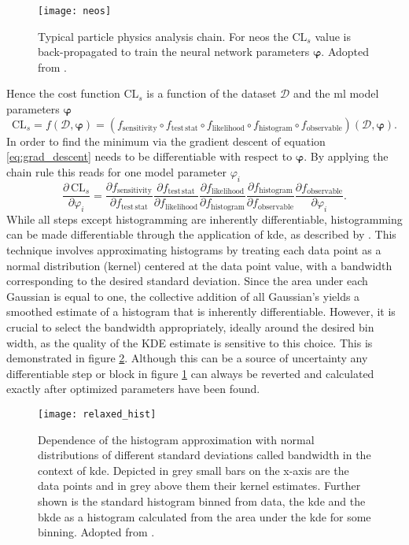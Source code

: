\begin{figure}
    \centering
    \texttt{[image: neos]}
    \caption[]{Typical particle physics analysis chain. For \ac{neos} the $\text{CL}_s$ value is back-propagated to train the neural network parameters $\bm{\varphi}$. Adopted from \citep{Simpson_2023}.}
    \label{fig:neos}
\end{figure}
Hence the cost function $\text{CL}_s$ is a function of the dataset $\mathcal{D}$ and the \ac{ml} model parameters $\bm{\varphi}$
\begin{equation}
    \mathrm{CL}_s = f(\mathcal{D},\bm{\varphi}) = (f_{\mathrm{sensitivity}} \circ f_{\mathrm{test\,stat}} \circ f_{\mathrm{likelihood}}  \circ f_{\mathrm{histogram}}  \circ f_{\mathrm{observable}})(\mathcal{D},\bm{\varphi}).
\end{equation}
In order to find the minimum via the gradient descent of equation \ref{eq:grad_descent} \cls needs to be differentiable with respect to $\bm{\varphi}$. By applying the chain rule this reads for one model parameter $\varphi_i$
\begin{equation}
    \frac{\partial\,\mathrm{CL}_s}{\partial \varphi_i} = \frac{\partial f_{\mathrm{sensitivity}}}{\partial f_{\mathrm{test\,stat}}}\frac{\partial f_{\mathrm{test\,stat}}}{\partial f_{ \mathrm{likelihood}}} \frac{\partial f_{\mathrm{likelihood}}}{\partial f_{\mathrm{histogram}}}   \frac{\partial f_{\mathrm{histogram}}}{\partial f_{\mathrm{observable}}}  \frac{\partial f_{\mathrm{observable}}}{\partial \varphi_i}.
\end{equation}
While all steps except histogramming are inherently differentiable, histogramming can be made differentiable through the application of \ac{kde}, as described by \citep{CRANMER2001198}. This technique involves approximating histograms by treating each data point as a normal distribution (kernel) centered at the data point value, with a bandwidth corresponding to the desired standard deviation. Since the area under each Gaussian is equal to one, the collective addition of all Gaussian's yields a smoothed estimate of a histogram that is inherently differentiable. However, it is crucial to select the bandwidth appropriately, ideally around the desired bin width, as the quality of the KDE estimate is sensitive to this choice. This is demonstrated in figure \ref{fig:relaxed_hist}. Although this can be a source of uncertainty any differentiable step or block in figure \ref{fig:neos} can always be reverted and calculated exactly after optimized parameters have been found.
\begin{figure}
    \centering
    \texttt{[image: relaxed\_hist]}
    \caption[]{Dependence of the histogram approximation with normal distributions of different standard deviations called bandwidth in the context of \ac{kde}. Depicted in grey small bars on the x-axis are the data points and in grey above them their kernel estimates. Further shown is the standard histogram binned from data, the \ac{kde} and the \ac{bkde} as a histogram calculated from the area under the \ac{kde} for some binning. Adopted from \citep{Simpson_2023}.}
    \label{fig:relaxed_hist}
\end{figure}



